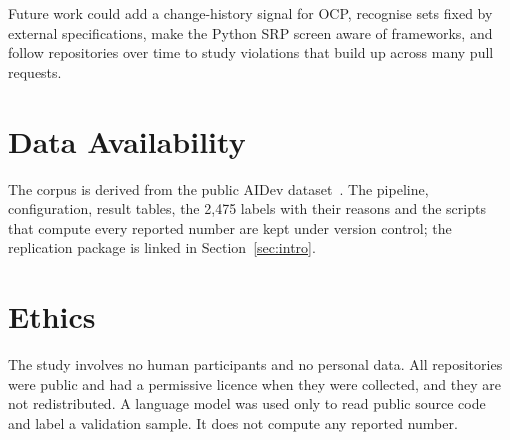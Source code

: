 \documentclass[sigconf]{acmart}
\begin{document}
Future work could add a change-history signal for OCP, recognise sets fixed by external
specifications, make the Python SRP screen aware of frameworks, and follow repositories over time to study violations that build up across many pull
requests.

\section*{Data Availability}

The corpus is derived from the public AIDev dataset~\cite{li2025aidev}. The pipeline, configuration,
result tables, the 2,475 labels with their reasons and the scripts that compute every reported number
are kept under version control; the replication package is linked in Section~\ref{sec:intro}.

\section*{Ethics}

The study involves no human participants and no personal data. All repositories were public and had
a permissive licence when they were collected, and they are not redistributed. A language model was
used only to read public source code and label a validation sample. It does not compute any reported
number.



\end{document}

